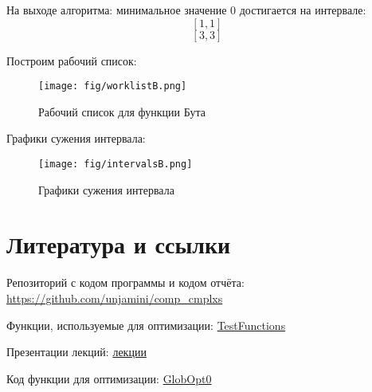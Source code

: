На выходе алгоритма: минимальное значение 0 достигается на интервале:
\[[1, 1]\]
\[[3, 3]\]

Построим рабочий список:
\begin{figure}[H]
\caption{Рабочий список для функции Бута}
\texttt{[image: fig/worklistB.png]}
\centering
\end{figure}

Графики сужения интервала:
\begin{figure}[H]
\caption{Графики сужения интервала}
\texttt{[image: fig/intervalsB.png]}
\centering
\end{figure}

\section{Литература и ссылки}

Репозиторий с кодом программы и кодом отчёта:
\href{https://github.com/unjamini/comp_cmplxs}{https://github.com/unjamini/comp\_cmplxs}

Функции, используемые для оптимизации:
\href{https://en.wikipedia.org/wiki/Test_functions_for_optimization}{TestFunctions}

Презентации лекций:
\href{https://cloud.mail.ru/public/5CaW/TsKmuyMp3/topic3.pdf}{лекции}

Код функции для оптимизации:
\href{http://www.nsc.ru/interval/Programing/MCodes/globopt0.m}{GlobOpt0}
